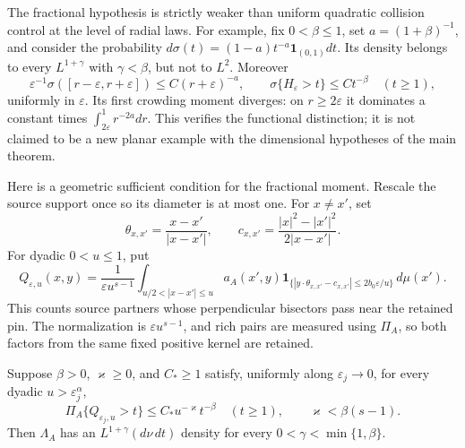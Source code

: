 The fractional hypothesis is strictly weaker than uniform quadratic
collision control at the level of radial laws. For example, fix
\(0<\beta\le1\), set \(a=(1+\beta)^{-1}\), and consider the
probability \(d\sigma(t)=(1-a)t^{-a}\mathbf1_{(0,1)}dt\).
Its density belongs to every \(L^{1+\gamma}\) with \(\gamma<\beta\),
but not to \(L^2\). Moreover
\[
 \varepsilon^{-1}\sigma([r-\varepsilon,r+\varepsilon])
 \le C(r+\varepsilon)^{-a},\qquad
 \sigma\{H_\varepsilon>t\}\le Ct^{-\beta}\quad(t\ge1),
\]
uniformly in \(\varepsilon\). Its first crowding moment diverges:
on \(r\ge2\varepsilon\) it dominates a constant times
\(\int_{2\varepsilon}^1r^{-2a}dr\).
This verifies the functional distinction; it is not claimed to be
a new planar example with the dimensional hypotheses of the main theorem.

Here is a geometric sufficient condition for the fractional moment.
Rescale the source support once so its diameter is at most one. For
\(x\ne x'\), set
\[
 \theta_{x,x'}=\frac{x-x'}{|x-x'|},\qquad
 c_{x,x'}=\frac{|x|^2-|x'|^2}{2|x-x'|}.
\]
For dyadic \(0<u\le1\), put
\begin{equation}\label{crowding:richquantity}
 Q_{\varepsilon,u}(x,y)
 =\frac1{\varepsilon u^{s-1}}
  \int_{u/2<|x-x'|\le u} a_A(x',y)
   \mathbf1_{\{|y\cdot\theta_{x,x'}-c_{x,x'}|
                    \le 2b_0\varepsilon/u\}}\,d\mu(x').
\end{equation}
This counts source partners whose perpendicular bisectors pass near
the retained pin. The normalization is \(\varepsilon u^{s-1}\),
and rich pairs are measured using \(\Pi_A\), so both factors from
the same fixed positive kernel are retained.

\begin{proposition}
\label{crowding:richtail}
Suppose \(\beta>0\), \(\varkappa\ge0\), and \(C_*\ge1\) satisfy,
uniformly along \(\varepsilon_j\to0\), for every dyadic
\(u>\varepsilon_j^\alpha\),
\begin{equation}\label{crowding:richhyp}
 \Pi_A\{Q_{\varepsilon_j,u}>t\}
 \le C_*u^{-\varkappa}t^{-\beta}\quad(t\ge1),
 \qquad \varkappa<\beta(s-1).
\end{equation}
Then \(\Lambda_A\) has an \(L^{1+\gamma}(d\nu\,dt)\) density for
every \(0<\gamma<\min\{1,\beta\}\).
\end{proposition}

